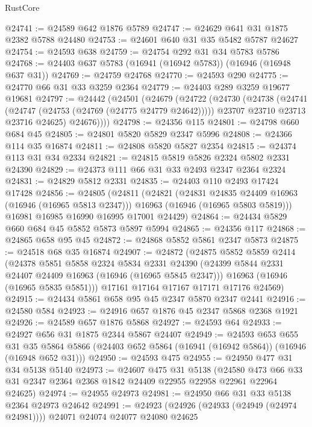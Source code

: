 \begin{lexlean}{RustCore}
\begin{coremodule}
@24741 := @24589 @642 @1876 @5789
@24747 := @24629 @641 @31 @1875 @2382 @5788 @24480
@24753 := @24601 @640 @31 @35 @5482 @5787 @24627
@24754 := @24593 @638
@24759 := @24754 @292 @31 @34 @5783 @5786
@24768 := @24403 @637 @5783 (@16941 (@16942 @5783)) (@16946 (@16948 @637 @31))
@24769 := @24759 @24768
@24770 := @24593 @290
@24775 := @24770 @66 @31 @33 @3259 @2364
@24779 := @24403 @289 @3259 @19677 @19681
@24797 := @24442
    (@24501
      (@24679
        (@24722
          (@24730
            (@24738
              (@24741 (@24747 (@24753 (@24769 (@24775 @24779 @24642)))))
              @23707
              @23710
              @23713
              @23716
              @24625)
            @24676))))
@24798 := @24356 @115
@24801 := @24798 @660 @684 @45
@24805 := @24801 @5820 @5829 @2347 @5996
@24808 := @24366 @114 @35 @16874
@24811 := @24808 @5820 @5827 @2354
@24815 := @24374 @113 @31 @34 @2334
@24821 := @24815 @5819 @5826 @2324 @5802 @2331 @24390
@24829 := @24373 @111 @66 @31 @33 @2493 @2347 @2364 @2324
@24831 := @24829 @5812 @2331
@24835 := @24403 @110 @2493 @17424 @17428
@24856 := @24805
    (@24811
      (@24821
        (@24831 @24835 @24409 @16963 (@16946 (@16965 @5813 @2347)))
        @16963
        (@16946 (@16965 @5803 @5819)))
      @16981
      @16985
      @16990
      @16995
      @17001
      @24429)
@24864 := @24434 @5829 @660 @684 @45 @5852 @5873 @5897 @5994
@24865 := @24356 @117
@24868 := @24865 @658 @95 @45
@24872 := @24868 @5852 @5861 @2347 @5873
@24875 := @24518 @68 @35 @16874
@24907 := @24872
    (@24875
      @5852
      @5859
      @2414
      (@24378
        @5851
        @5858
        @2324
        @5834
        @2331
        @24390
        (@24399 @5844 @2331 @24407 @24409 @16963 (@16946 (@16965 @5845 @2347)))
        @16963
        (@16946 (@16965 @5835 @5851)))
      @17161
      @17164
      @17167
      @17171
      @17176
      @24569)
@24915 := @24434 @5861 @658 @95 @45 @2347 @5870 @2347 @2441
@24916 := @24580 @584
@24923 := @24916 @657 @1876 @45 @2347 @5868 @2368 @1921
@24926 := @24589 @657 @1876 @5868
@24927 := @24593 @64
@24933 := @24927 @656 @31 @1875 @2344 @5867 @24407
@24949 := @24593
    @653
    @655
    @31
    @35
    @5864
    @5866
    (@24403 @652 @5864 (@16941 (@16942 @5864)) (@16946 (@16948 @652 @31)))
@24950 := @24593 @475
@24955 := @24950 @477 @31 @34 @5138 @5140
@24973 := @24607
    @475
    @31
    @5138
    (@24580 @473 @66 @33 @31 @2347 @2364 @2368 @1842 @24409 @22955 @22958 @22961 @22964 @24625)
@24974 := @24955 @24973
@24981 := @24950 @66 @31 @33 @5138 @2364 @24973 @24642
@24991 := @24923 (@24926 (@24933 (@24949 (@24974 @24981)))) @24071 @24074 @24077 @24080 @24625

\end{coremodule}
\end{lexlean}
